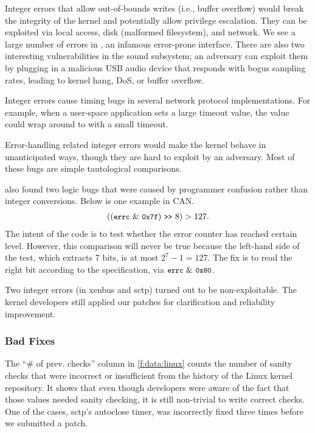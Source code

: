 Integer errors that allow out-of-bounds writes (i.e., buffer
overflow) would break the integrity of the kernel and potentially
allow privilege escalation.  They can be exploited via local access,
disk (malformed filesystem), and network.  We see a large number of
errors in , an infamous error-prone interface.
%
There are also two interesting vulnerabilities in the sound subsystem;
an adversary can exploit them by plugging in a malicious USB audio
device that responds with bogus sampling rates, leading to kernel
hang, DoS, or buffer overflow.

Integer errors cause timing bugs in several network protocol
implementations.  For example, when a user-space application sets
a large timeout value, the value could wrap around to
with a small timeout.

Error-handling related integer errors would make the kernel behave in
unanticipated ways, though they are hard to exploit by an adversary.
Most of these bugs are simple tautological comparisons.

\sys also found two logic bugs that were caused by programmer
confusion rather than integer conversions.
Below is one example in CAN\@.
\begin{align*}
((\cc{errc}\ \&\ \cc{0x7f}) \shr 8) > 127.
\end{align*}
The intent of the code is to test whether the error counter 
has reached certain level.  However, this
comparison will never be true because the left-hand side of the test,
which extracts 7 bits, is at most
$2^7 - 1 = 127$.  The fix is to read the right bit according to the specification,
via $\cc{errc}\ \&\ \cc{0x80}$.

Two integer errors (in xenbus and sctp) turned out
to be non-exploitable.  The kernel developers still applied our
patches for clarification and reliability improvement.

\subsubsection{Bad Fixes}
\label{s:eval:bad}

The ``\# of prev. checks'' column in \autoref{f:data:linux} counts
the number of sanity checks that were incorrect or insufficient
from the history of the Linux kernel repository.
It shows that even though developers were aware of the fact that
those values needed sanity checking, it is still non-trivial
to write correct checks.
One of the cases, sctp's autoclose timer, was incorrectly fixed
three times before we submitted a patch.

